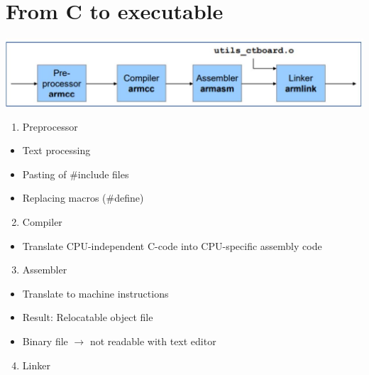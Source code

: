\documentclass[10pt]{article}
\begin{document}
\section*{From C to executable}
\begin{center}
\includegraphics[max width=\textwidth]{2024_12_29_79e6b22f503fb7b4f718g-01}
\end{center}

\begin{enumerate}
  \item Preprocessor
\end{enumerate}

\begin{itemize}
  \item Text processing
  \item Pasting of \#include files
  \item Replacing macros (\#define)
\end{itemize}

\begin{enumerate}
  \setcounter{enumi}{1}
  \item Compiler
\end{enumerate}

\begin{itemize}
  \item Translate CPU-independent C-code into CPU-specific assembly code
\end{itemize}

\begin{enumerate}
  \setcounter{enumi}{2}
  \item Assembler
\end{enumerate}

\begin{itemize}
  \item Translate to machine instructions
  \item Result: Relocatable object file
  \item Binary file $\rightarrow$ not readable with text editor
\end{itemize}

\begin{enumerate}
  \setcounter{enumi}{3}
  \item Linker
\end{enumerate}
\end{document}
